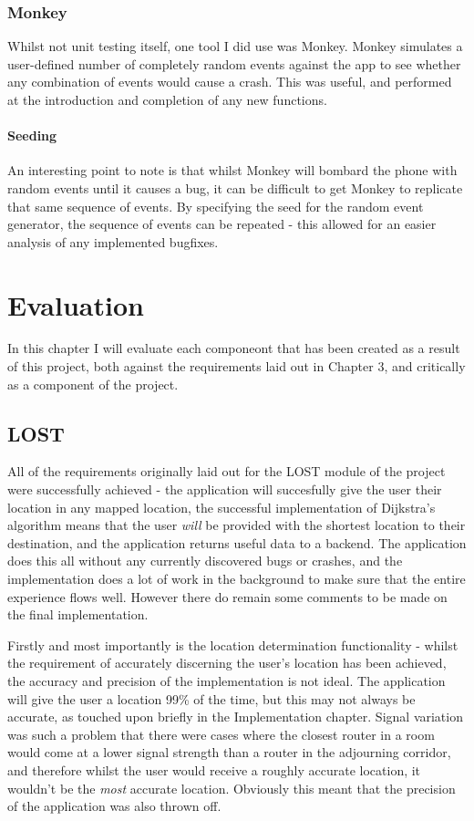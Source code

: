 \documentclass[11pt]{informatics-report}
\begin{document}
\subsection{Monkey}

Whilst not unit testing itself, one tool I did use was Monkey. Monkey simulates a user-defined number of completely random events against the app to see whether any combination of events would cause a crash. This was useful, and performed at the introduction and completion of any new functions.

\subsubsection{Seeding}

An interesting point to note is that whilst Monkey will bombard the phone with random events until it causes a bug, it can be difficult to get Monkey to replicate that same sequence of events. By specifying the seed for the random event generator, the sequence of events can be repeated - this allowed for an easier analysis of any implemented bugfixes. 


\chapter{Evaluation}

In this chapter I will evaluate each componeont that has been created as a result of this project, both against the requirements laid out in Chapter 3, and critically as a component of the project.

\section{LOST} 

All of the requirements originally laid out for the LOST module of the project were successfully achieved - the application will succesfully give the user their location in any mapped location, the successful implementation of Dijkstra's algorithm means that the user \textit{will} be provided with the shortest location to their destination, and the application returns useful data to a backend. The application does this all without any currently discovered bugs or crashes, and the implementation does a lot of work in the background to make sure that the entire experience flows well. However there do remain some comments to be made on the final implementation.

Firstly and most importantly is the location determination functionality - whilst the requirement of accurately discerning the user's location has been achieved, the accuracy and precision of the implementation is not ideal. The application will give the user a location 99\% of the time, but this may not always be accurate, as touched upon briefly in the Implementation chapter. Signal variation was such a problem that there were cases where the closest router in a room would come at a lower signal strength than a router in the adjourning corridor, and therefore whilst the user would receive a roughly accurate location, it wouldn't be the \textit{most} accurate location. Obviously this meant that the precision of the application was also thrown off.
\end{document}
